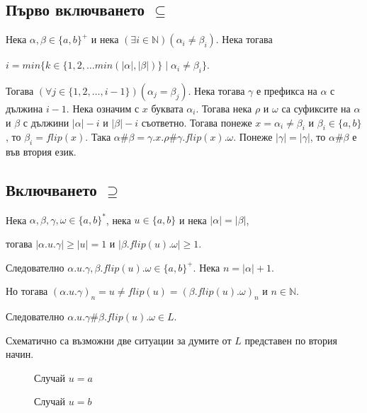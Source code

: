 \documentclass[12pt]{article}
\begin{document}
\subsection*{Първо включването \(\subseteq\)}
Нека \(\alpha, \beta \in \{a, b\}^+\) и нека \((\exists i \in \mathbb N)(\alpha_i \neq \beta_i)\).
Нека тогава

\(i = min \{k \in \{1, 2, \dots min(|\alpha|, |\beta|)\} \mid \alpha_i \neq \beta_i \}\).

Тогава \((\forall j \in \{1, 2, \dots, i - 1\})(\alpha_j = \beta_j)\).
Нека тогава \(\gamma\) е префикса на \(\alpha\) с дължина \(i - 1\).
Нека означим с \(x\) буквата \(\alpha_i\). Тогава нека \(\rho\) и \(\omega\)
са суфиксите на \(\alpha\) и \(\beta\) с дължини \(|\alpha| - i\) и \(|\beta| - i\) съответно.
Тогава понеже \(x = \alpha_i \neq \beta_i\) и \(\beta_i \in \{a, b\}\), то \(\beta_i = flip(x)\).
Така \(\alpha\#\beta = \gamma.x.\rho \# \gamma.flip(x).\omega\). Понеже \(|\gamma| = |\gamma|\), то
\(\alpha\#\beta\) е във втория език.

\subsection*{Включването \(\supseteq\)}
Нека \(\alpha, \beta, \gamma, \omega \in \{a, b\}^*\), нека \(u \in \{a, b\}\) и нека \(|\alpha| = |\beta|\),

тогава \(|\alpha.u.\gamma| \geq |u| = 1\) и \(|\beta.flip(u).\omega| \geq 1\).

Следователно \(\alpha.u.\gamma, \beta.flip(u).\omega \in \{a, b\}^+\). Нека \(n = |\alpha| + 1\).

Но тогава \((\alpha.u.\gamma)_n = u \neq flip(u) = (\beta.flip(u).\omega)_n\) и \(n \in \mathbb N\).

Следователно \(\alpha.u.\gamma\#\beta.flip(u).\omega \in L\).

Схематично са възможни две ситуации за думите от \(L\) представен по втория начин. 

\begin{figure}[H]
\centering
{}
\caption{Случай $u = a$}
\end{figure}

\begin{figure}[H]
\centering
{}
\caption{Случай $u = b$}
\end{figure}
\end{document}
